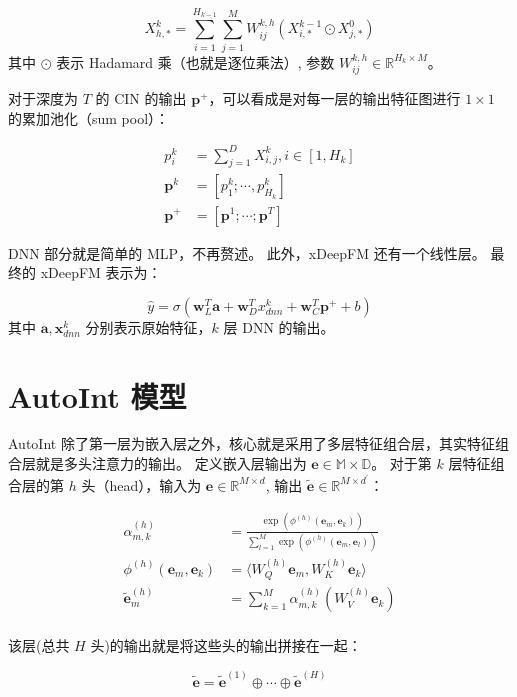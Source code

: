 \documentclass[degree=project,degree-type=project,cjk-font=noto]{thuthesis}
\begin{document}
\begin{equation}
  X^k_{h,*} = \sum_{i=1}^{H_{k-1}} \sum_{j=1}^{M} W_{ij}^{k,h}(X_{i,*}^{k-1} \odot X_{j,*}^0)
\end{equation}
其中 $\odot$ 表示 Hadamard 乘（也就是逐位乘法）, 参数 $W_{ij}^{k,h} \in \mathbb{R}^{H_k \times M}$。

对于深度为 $T$ 的 CIN 的输出 $\bm{p}^+$，可以看成是对每一层的输出特征图进行 $1\times 1$ 的累加池化（sum pool）：

\begin{align}
  p_i^k &= \sum_{j=1}^D X_{i,j}^k, i \in [1, H_k] \\
  \bm{p}^k &= [p_1^k; \cdots, p_{H_k}^k] \\
  \bm{p}^+ &= [\bm{p}^1; \cdots; \bm{p}^T]
\end{align}

DNN 部分就是简单的 MLP，不再赘述。
此外，xDeepFM 还有一个线性层。
最终的 xDeepFM 表示为：

\begin{equation}
  \hat{y} = \sigma(\bm{w}_L^T \bm{a} + \bm{w}_D^T x^k_{dnn} + \bm{w}_C^T \bm{p}^+ + b)
\end{equation}
其中 $\bm{a}, \bm{x}^k_{dnn}$ 分别表示原始特征，$k$ 层 DNN 的输出。

\section{AutoInt 模型}

AutoInt 除了第一层为嵌入层之外，核心就是采用了多层特征组合层，其实特征组合层就是多头注意力的输出。
定义嵌入层输出为 $\bm{e} \in \mathbb{M \times D}$。
对于第 $k$ 层特征组合层的第 $h$ 头（head），输入为 $\bm{e} \in \mathbb{R}^{M \times d}$, 输出 $\tilde{\bm{e}} \in \mathbb{R}^{M \times d^\prime}$：

\begin{align}
  \alpha_{m,k}^{(h)} &= \frac{\exp(\phi^{(h)}(\bm{e}_m, \bm{e}_k))}{\sum_{l=1}^M \exp(\phi^{(h)}(\bm{e}_m, \bm{e}_l))} \\
  \phi^{(h)}(\bm{e}_m, \bm{e}_k) &= \langle W_Q^{(h)} \bm{e}_m, W_K^{(h)} \bm{e}_k\rangle \\
  \tilde{\bm{e}}_m^{(h)} &= \sum_{k=1}^M \alpha_{m,k}^{(h)} (W_V^{(h)} \bm{e}_k) \\
\end{align}

该层(总共 $H$ 头)的输出就是将这些头的输出拼接在一起：

\begin{equation}
  \tilde{\bm{e}} = \tilde{\bm{e}}^{(1)} \oplus \cdots \oplus \tilde{\bm{e}}^{(H)}
\end{equation}
\end{document}
